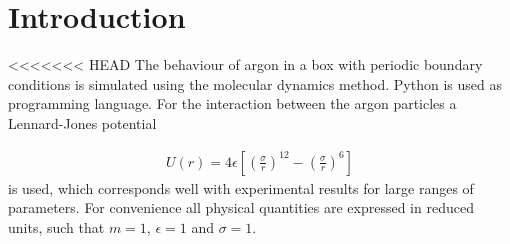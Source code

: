 \section{Introduction}
<<<<<<< HEAD
The behaviour of argon in a box with periodic boundary conditions is simulated using the molecular dynamics method. Python is used as programming language. For the interaction between the argon particles a Lennard-Jones potential

\begin{gather}
U(r) = 4\epsilon \left[\left(\frac{\sigma}{r}\right)^12-\left(\frac{\sigma}{r}\right)^6\right]
\end{gather}
is used, which corresponds well with experimental results for large ranges of parameters\cite{hoover1970comparison}. For convenience all physical quantities are expressed in reduced units, such that $m=1$, $\epsilon = 1$ and $\sigma = 1$. 

